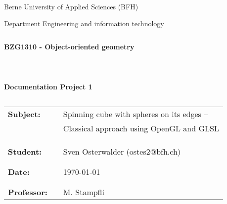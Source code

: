 \thispagestyle{empty}
\begin{center}
\Large{Berne University of Applied Sciences (BFH)}\\
\end{center}
 
 
\begin{center}
\Large{Department Engineering and information technology}
\end{center}
\begin{verbatim}
\end{verbatim}
\begin{center}
\textbf{\LARGE{BZG1310 -  Object-oriented geometry}}
\end{center}
\begin{verbatim}
 
 
\end{verbatim}
\begin{center}
\textbf{Documentation Project 1}
\end{center}
\begin{verbatim} 
\end{verbatim}
 
\begin{flushleft}
\begin{tabular}{lll}
\textbf{Subject:} & & Spinning cube with spheres on its edges --\\
& & Classical approach using OpenGL and GLSL\\
& & \\
& & \\
& & \\
\textbf{Student:} & & Sven Osterwalder (ostes2@bfh.ch)\\
& & \\
& & \\
\textbf{Date:} & & {\today}\\
& & \\
& & \\
\textbf{Professor:} & & M. Stampfli
\end{tabular}
\end{flushleft}